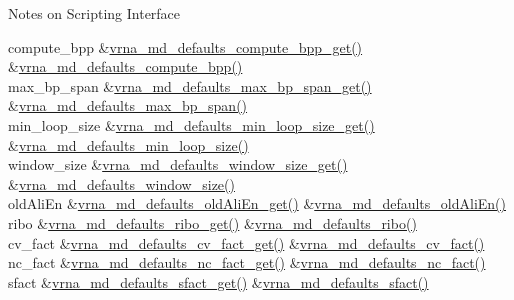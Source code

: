 \begin{DoxyRefDesc}{Notes on Scripting Interface}
\begin{longtabu}
compute\+\_\+bpp &\hyperlink{group__model__details_gaa3a537e61fbe0518673bf9f73fd820f3}{vrna\+\_\+md\+\_\+defaults\+\_\+compute\+\_\+bpp\+\_\+get()} &\hyperlink{group__model__details_gaf1b5db10f1f476767f9a95f8a78e3132}{vrna\+\_\+md\+\_\+defaults\+\_\+compute\+\_\+bpp()} \\
max\+\_\+bp\+\_\+span &\hyperlink{group__model__details_gaa60f989e062fecd4d4bac89c1883da85}{vrna\+\_\+md\+\_\+defaults\+\_\+max\+\_\+bp\+\_\+span\+\_\+get()} &\hyperlink{group__model__details_ga4c4bc962f09b4480cb8499f1cf8ae4ec}{vrna\+\_\+md\+\_\+defaults\+\_\+max\+\_\+bp\+\_\+span()} \\
min\+\_\+loop\+\_\+size &\hyperlink{group__model__details_ga5cc691174a75c652807dc361b617632a}{vrna\+\_\+md\+\_\+defaults\+\_\+min\+\_\+loop\+\_\+size\+\_\+get()} &\hyperlink{group__model__details_gac152f1e78c1058a10261022c8dfda0f7}{vrna\+\_\+md\+\_\+defaults\+\_\+min\+\_\+loop\+\_\+size()} \\
window\+\_\+size &\hyperlink{group__model__details_ga670146a9aa3ba77f4d422d60b7c30ac9}{vrna\+\_\+md\+\_\+defaults\+\_\+window\+\_\+size\+\_\+get()} &\hyperlink{group__model__details_ga7b802ce0e8c3181bf5cb580de6d5b26a}{vrna\+\_\+md\+\_\+defaults\+\_\+window\+\_\+size()} \\
old\+Ali\+En &\hyperlink{group__model__details_ga2374492b5019df88022fe4c05f0f3630}{vrna\+\_\+md\+\_\+defaults\+\_\+old\+Ali\+En\+\_\+get()} &\hyperlink{group__model__details_ga41521d5b9fb7e0f31e7ea73f5792afab}{vrna\+\_\+md\+\_\+defaults\+\_\+old\+Ali\+En()} \\
ribo &\hyperlink{group__model__details_ga169027f0c0561ea7d87b655e4b336bfc}{vrna\+\_\+md\+\_\+defaults\+\_\+ribo\+\_\+get()} &\hyperlink{group__model__details_ga937c45e1d06fd6168730a9b08d130be3}{vrna\+\_\+md\+\_\+defaults\+\_\+ribo()} \\
cv\+\_\+fact &\hyperlink{group__model__details_gae59c68393807217b0a2497adb64d3ee3}{vrna\+\_\+md\+\_\+defaults\+\_\+cv\+\_\+fact\+\_\+get()} &\hyperlink{group__model__details_gad3a3f40baafd91a6ce80a91a68e20053}{vrna\+\_\+md\+\_\+defaults\+\_\+cv\+\_\+fact()} \\
nc\+\_\+fact &\hyperlink{group__model__details_ga7ac759eaa7159bf5f022745f5da59508}{vrna\+\_\+md\+\_\+defaults\+\_\+nc\+\_\+fact\+\_\+get()} &\hyperlink{group__model__details_gac35e596c850dce3ad55c49119fd7d471}{vrna\+\_\+md\+\_\+defaults\+\_\+nc\+\_\+fact()} \\
sfact &\hyperlink{group__model__details_gab2df6aab954b63fd3592d18e90285dae}{vrna\+\_\+md\+\_\+defaults\+\_\+sfact\+\_\+get()} &\hyperlink{group__model__details_ga3f73d3029d3d0025d4cc311510cd95a3}{vrna\+\_\+md\+\_\+defaults\+\_\+sfact()} \\
\end{longtabu}
\end{DoxyRefDesc}
